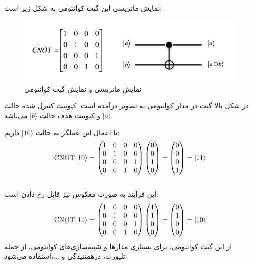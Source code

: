 \documentclass{book}
\begin{document}
نمایش ماتریسی این گیت کوانتومی به شکل زیر است:
\begin{figure}[ht]
	\centering
	\includegraphics[width=\linewidth]{Matrix-representation-and-quantum-circuit-of-CNOT-gate.png}
	\caption{نمایش ماتریسی و نمایش گیت کوانتومی }
	\label{CNOT}
\end{figure}


در شکل بالا گیت  در مدار کوانتومی به تصویر درآمده است. کیوبیت کنترل شده  حالت $\vert a \rangle$ و کیوبیت هدف حالت $\vert b \rangle$ می‌باشد.


با اعمال این عملگر به حالت $\vert 10\rangle$ داریم:
$$
\text{CNOT} \ket{10} = \begin{pmatrix}
	1 & 0 & 0 & 0 \\
	0 & 1 & 0 & 0 \\
	0 & 0 & 0 & 1 \\
	0 & 0 & 1 & 0
\end{pmatrix} \begin{pmatrix}
	0 \\
	0 \\
	1 \\
	0
\end{pmatrix} = \begin{pmatrix}
	0 \\
	0 \\
	0 \\
	1
\end{pmatrix} = \ket{11}
$$\\
این فرآیند به صورت معکوس نیز قابل رخ دادن است:\\

$$
\text{CNOT} \ket{11} = \begin{pmatrix}
	1 & 0 & 0 & 0 \\
	0 & 1 & 0 & 0 \\
	0 & 0 & 0 & 1 \\
	0 & 0 & 1 & 0
\end{pmatrix} \begin{pmatrix}
	1 \\
	1 \\
	0 \\
	0
\end{pmatrix} = \begin{pmatrix}
	0 \\
	1 \\
	0 \\
	0
\end{pmatrix} = \ket{10}
$$
از این گیت کوانتومی‌، برای بسیاری مدار‌ها و شبیه‌سازی‌های کوانتومی، از جمله تلپورت، درهمتنیدگی و ...،استفاده می‌شود.
\end{document}
